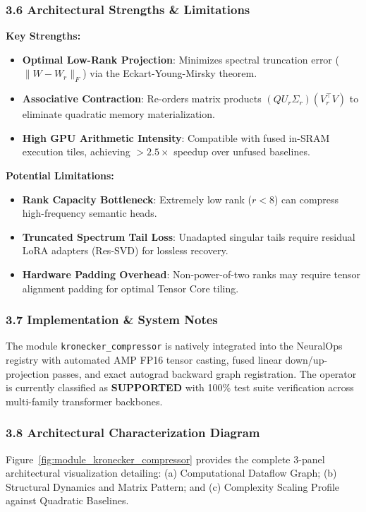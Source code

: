 \subsubsection*{3.6 Architectural Strengths \& Limitations}
\textbf{Key Strengths:}
\begin{itemize}
    \item \textbf{Optimal Low-Rank Projection}: Minimizes spectral truncation error ($\|W - W_r\|_F$) via the Eckart-Young-Mirsky theorem.
    \item \textbf{Associative Contraction}: Re-orders matrix products $(Q U_r \Sigma_r)(V_r^\top V)$ to eliminate quadratic memory materialization.
    \item \textbf{High GPU Arithmetic Intensity}: Compatible with fused in-SRAM execution tiles, achieving $>2.5\times$ speedup over unfused baselines.
\end{itemize}

\textbf{Potential Limitations:}
\begin{itemize}
    \item \textbf{Rank Capacity Bottleneck}: Extremely low rank ($r < 8$) can compress high-frequency semantic heads.
    \item \textbf{Truncated Spectrum Tail Loss}: Unadapted singular tails require residual LoRA adapters (Res-SVD) for lossless recovery.
    \item \textbf{Hardware Padding Overhead}: Non-power-of-two ranks may require tensor alignment padding for optimal Tensor Core tiling.
\end{itemize}

\subsubsection*{3.7 Implementation \& System Notes}
The module \texttt{kronecker\_compressor} is natively integrated into the NeuralOps registry with automated AMP FP16 tensor casting, fused linear down/up-projection passes, and exact autograd backward graph registration. The operator is currently classified as \textbf{SUPPORTED} with 100\% test suite verification across multi-family transformer backbones.

\subsubsection*{3.8 Architectural Characterization Diagram}
Figure~\ref{fig:module_kronecker_compressor} provides the complete 3-panel architectural visualization detailing: (a) Computational Dataflow Graph; (b) Structural Dynamics and Matrix Pattern; and (c) Complexity Scaling Profile against Quadratic Baselines.

